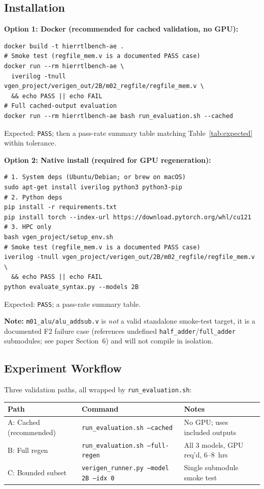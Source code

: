\documentclass[sigplan,10pt,twocolumn]{acmart}
\begin{document}
\begin{itemize}
\subsection{Installation}

\noindent\textbf{Option 1: Docker (recommended for cached validation,
no GPU):}
\begin{lstlisting}
docker build -t hierrtlbench-ae .
# Smoke test (regfile_mem.v is a documented PASS case)
docker run --rm hierrtlbench-ae \
  iverilog -tnull vgen_project/verigen_out/2B/m02_regfile/regfile_mem.v \
  && echo PASS || echo FAIL
# Full cached-output evaluation
docker run --rm hierrtlbench-ae bash run_evaluation.sh --cached
\end{lstlisting}
Expected: \texttt{PASS}; then a pass-rate summary table matching
Table~\ref{tab:expected} within tolerance.

\noindent\textbf{Option 2: Native install (required for GPU
regeneration):}
\begin{lstlisting}
# 1. System deps (Ubuntu/Debian; or brew on macOS)
sudo apt-get install iverilog python3 python3-pip
# 2. Python deps
pip install -r requirements.txt
pip install torch --index-url https://download.pytorch.org/whl/cu121
# 3. HPC only
bash vgen_project/setup_env.sh
# Smoke test (regfile_mem.v is a documented PASS case)
iverilog -tnull vgen_project/verigen_out/2B/m02_regfile/regfile_mem.v \
  && echo PASS || echo FAIL
python evaluate_syntax.py --models 2B
\end{lstlisting}
Expected: \texttt{PASS}; a pass-rate summary table.

\noindent\textbf{Note:} \texttt{m01\_alu/alu\_addsub.v} is \emph{not} a
valid standalone smoke-test target, it is a documented F2 failure
case (references undefined \texttt{half\_adder}/\texttt{full\_adder}
submodules; see paper Section~6) and will not compile in isolation.

\subsection{Experiment Workflow}

Three validation paths, all wrapped by \texttt{run\_evaluation.sh}:

\begin{table}[h]
\centering\footnotesize
\begin{tabular}{@{}p{1.55cm}p{2.6cm}p{2.9cm}@{}}
\toprule
Path & Command & Notes \\
\midrule
A: Cached (recommended) & \texttt{run\_evaluation.sh --cached} &
  No GPU; uses included outputs \\
B: Full regen & \texttt{run\_evaluation.sh --full-regen} &
  All 3 models, GPU req'd, 6--8~hrs \\
C: Bounded subset & \texttt{verigen\_runner.py --model 2B --idx 0} &
  Single submodule smoke test \\
\bottomrule
\end{tabular}
\end{table}
\vspace{-6pt}


\end{itemize}
\end{document}
